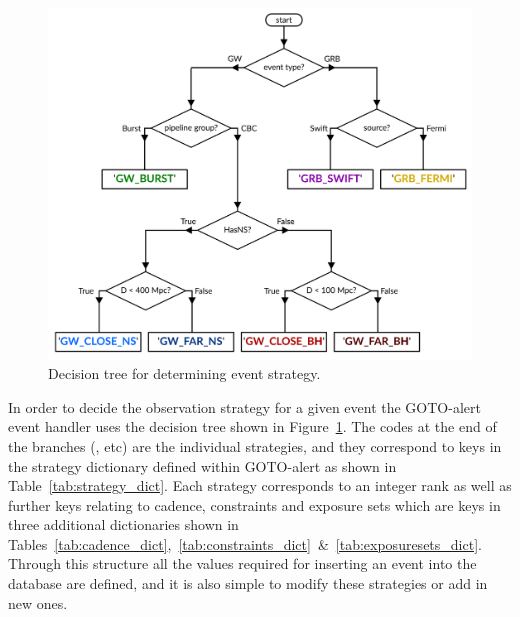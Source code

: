 \begin{colsection}
\begin{colsection}
\newpage

\begin{figure}[t]
\begin{center}
\includegraphics[width=\linewidth]{images/strategy_flowchart.pdf}
\end{center}
\caption[Decision tree for determining event strategy]{Decision tree for determining event strategy.
}
\label{fig:strategy_flowchart}
\end{figure}

In order to decide the observation strategy for a given event the GOTO-alert event handler uses the decision tree shown in Figure~\ref{fig:strategy_flowchart}. The codes at the end of the branches (,  etc) are the individual strategies, and they correspond to keys in the strategy dictionary defined within GOTO-alert as shown in Table~\ref{tab:strategy_dict}. Each strategy corresponds to an integer rank as well as further keys relating to cadence, constraints and exposure sets which are keys in three additional dictionaries shown in Tables~\ref{tab:cadence_dict},~\ref{tab:constraints_dict}~\&~\ref{tab:exposuresets_dict}. Through this structure all the values required for inserting an event into the database are defined, and it is also simple to modify these strategies or add in new ones.

\clearpage


\begin{table}[!p]
\begin{center}
\begin{tabular}{lclll}


\end{tabular}
\end{center}
\end{table}
\end{colsection}
\end{colsection}
